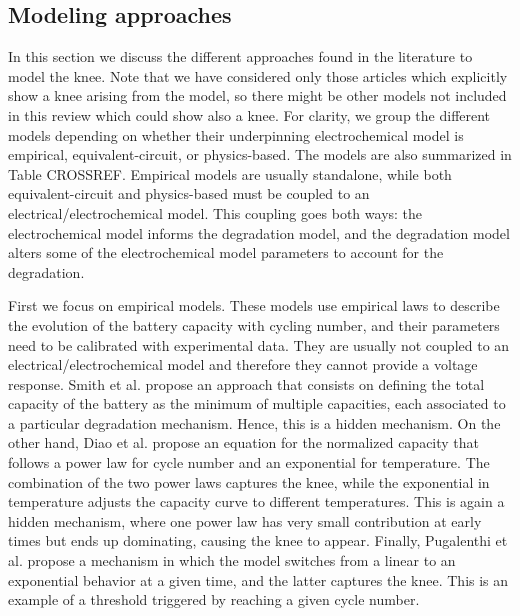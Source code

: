 \documentclass[journal=jpclcd,manuscript=article]{achemso}
\begin{document}


\subsection{Modeling approaches}
In this section we discuss the different approaches found in the literature to model the knee. Note that we have considered only those articles which explicitly show a knee arising from the model, so there might be other models not included in this review which could show also a knee. For clarity, we group the different models depending on whether their underpinning electrochemical model is empirical, equivalent-circuit, or physics-based. The models are also summarized in Table {\color{red} CROSSREF}. Empirical models are usually standalone, while both equivalent-circuit and physics-based must be coupled to an electrical/electrochemical model. This coupling goes both ways: the electrochemical model informs the degradation model, and the degradation model alters some of the electrochemical model parameters to account for the degradation. 

First we focus on empirical models. These models use empirical laws to describe the evolution of the battery capacity with cycling number, and their parameters need to be calibrated with experimental data. They are usually not coupled to an electrical/electrochemical model and therefore they cannot provide a voltage response. Smith et al. \cite{smith_models_2014,smith_life_2017} propose an approach that consists on defining the total capacity of the battery as the minimum of multiple capacities, each associated to a particular degradation mechanism. Hence, this is a hidden mechanism. On the other hand, Diao et al. \cite{diao_accelerated_2019} propose an equation for the normalized capacity that follows a power law for cycle number and an exponential for temperature. The combination of the two power laws captures the knee, while the exponential in temperature adjusts the capacity curve to different temperatures. This is again a hidden mechanism, where one power law has very small contribution at early times but ends up dominating, causing the knee to appear. Finally, Pugalenthi et al. \cite{pugalenthi_piecewise_2020} propose a mechanism in which the model switches from a linear to an exponential behavior at a given time, and the latter captures the knee. This is an example of a threshold triggered by reaching a given cycle number.
\end{document}
